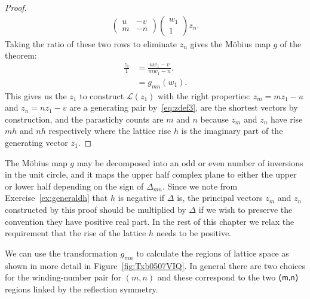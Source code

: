 \begin{proof}
\begin{align}
\begin{pmatrix}
		u & -v\\ m & -n
	\end{pmatrix}
	\begin{pmatrix}
		w_1 \\ 1 
	\end{pmatrix} z_n.
	\label{eq:zinv2}
\end{align}
Taking the ratio of these two rows to  eliminate $z_n$ 
 gives the M\"obius map $g$ of the theorem: 
\begin{align}
\frac{z_1}{1}&= \frac{ u w_1  - v}{m w_1 - n}.\label{eq:gmnzmn1}
\\
&= g_{mn} \left(w_1\right).\label{eq:gmnzmn}
\end{align}
This gives us the $z_1$ to construct $\mathcal{L}(z_1)$ with the right properties:  $z_m=mz_1-u$ and $z_n= n z_1-v$ are a generating pair by~\eqref{eq:zdef3}, are the shortest vectors by construction, and the parastichy counts are $m$ and $n$ because $z_m$ and $z_n$ have rise $m h$ and $n h$ respectively where the lattice rise $h$ is the  imaginary part of the generating vector $z_1$. 


\end{proof}
The M\"obius map $g$ may be decomposed into an odd or even number of inversions in the unit circle, and it maps the upper half complex plane to either the upper or lower half depending on the sign of $\Delta_{mn}$. Since we note from Exercise~\ref{ex:generaldh} that $h$ is negative if $\Delta$ is, the principal vectors $z_m$ and $z_n$ constructed by this proof should be multiplied by $\Delta$ if we wish to preserve the convention they have positive real part. In the rest of this chapter we relax the requirement that the rise of the lattice $h$ needs to be positive.

We can use the transformation $g_{mn}$ to calculate the regions of
lattice space as shown in more detail in Figure~\ref{fig:Txb0507VIQ}.
In general there are two choices for the winding-number pair for $(m,n)$ and these correspond to the two $\textsf{(m,n)}$ regions linked by the reflection symmetry.

